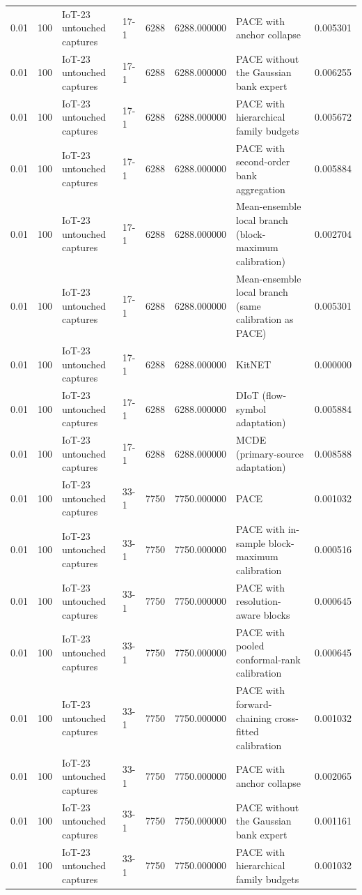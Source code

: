 \begin{tabular}{llllllll}
0.01 & 100 & IoT-23 untouched captures & 17-1 & 6288 & 6288.000000 & PACE with anchor collapse & 0.005301 \\
0.01 & 100 & IoT-23 untouched captures & 17-1 & 6288 & 6288.000000 & PACE without the Gaussian bank expert & 0.006255 \\
0.01 & 100 & IoT-23 untouched captures & 17-1 & 6288 & 6288.000000 & PACE with hierarchical family budgets & 0.005672 \\
0.01 & 100 & IoT-23 untouched captures & 17-1 & 6288 & 6288.000000 & PACE with second-order bank aggregation & 0.005884 \\
0.01 & 100 & IoT-23 untouched captures & 17-1 & 6288 & 6288.000000 & Mean-ensemble local branch (block-maximum calibration) & 0.002704 \\
0.01 & 100 & IoT-23 untouched captures & 17-1 & 6288 & 6288.000000 & Mean-ensemble local branch (same calibration as PACE) & 0.005301 \\
0.01 & 100 & IoT-23 untouched captures & 17-1 & 6288 & 6288.000000 & KitNET & 0.000000 \\
0.01 & 100 & IoT-23 untouched captures & 17-1 & 6288 & 6288.000000 & DIoT (flow-symbol adaptation) & 0.005884 \\
0.01 & 100 & IoT-23 untouched captures & 17-1 & 6288 & 6288.000000 & MCDE (primary-source adaptation) & 0.008588 \\
0.01 & 100 & IoT-23 untouched captures & 33-1 & 7750 & 7750.000000 & PACE & 0.001032 \\
0.01 & 100 & IoT-23 untouched captures & 33-1 & 7750 & 7750.000000 & PACE with in-sample block-maximum calibration & 0.000516 \\
0.01 & 100 & IoT-23 untouched captures & 33-1 & 7750 & 7750.000000 & PACE with resolution-aware blocks & 0.000645 \\
0.01 & 100 & IoT-23 untouched captures & 33-1 & 7750 & 7750.000000 & PACE with pooled conformal-rank calibration & 0.000645 \\
0.01 & 100 & IoT-23 untouched captures & 33-1 & 7750 & 7750.000000 & PACE with forward-chaining cross-fitted calibration & 0.001032 \\
0.01 & 100 & IoT-23 untouched captures & 33-1 & 7750 & 7750.000000 & PACE with anchor collapse & 0.002065 \\
0.01 & 100 & IoT-23 untouched captures & 33-1 & 7750 & 7750.000000 & PACE without the Gaussian bank expert & 0.001161 \\
0.01 & 100 & IoT-23 untouched captures & 33-1 & 7750 & 7750.000000 & PACE with hierarchical family budgets & 0.001032 \\

\end{tabular}
